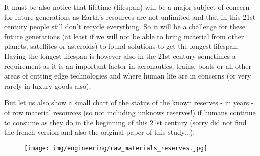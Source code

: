 	It must be also notice that lifetime (lifespan) will be a major subject of concern for future generations as Earth's resources are not unlimited and that in this 21st century people still don't recycle everything. So it will be a challenge for these future generations (at least if we will not be able to bring material from other planets, satellites or asteroids) to found solutions to get the longest lifespan. Having the longest lifespan is however also in the 21st century sometimes a requirement as it is an important factor in aeronautics, trains, boats or all other areas of cutting edge technologies and where human life are in concerns (or very rarely in luxury goods also).

	But let us also show a small chart of the status of the known reserves - in years - of row material resources (so not including unknows reserves!) if humans continue to consume as they do in the beginning of this 21st century (sorry did not find the french version and also the original paper of this study...):
	\begin{figure}[H]
		\centering
		\texttt{[image: img/engineering/raw\_materials\_reserves.jpg]}
	\end{figure}
		
	\pagebreak
